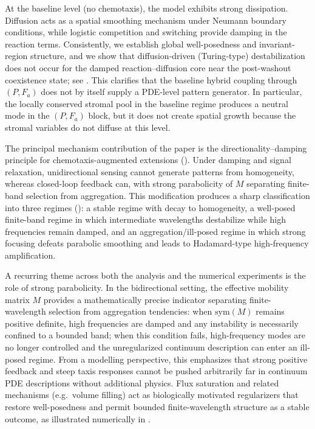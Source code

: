\documentclass[pdflatex,sn-mathphys-ay]{sn-jnl}
\theoremstyle{thmstyleone}
\theoremstyle{definition}
\theoremstyle{remark}
\begin{document}
At the baseline level (no chemotaxis), the model exhibits strong dissipation. 
Diffusion acts as a spatial smoothing mechanism under Neumann boundary conditions, while logistic competition and switching provide damping in the reaction terms. 
Consistently, we establish global well-posedness and invariant-region structure, and we show that diffusion-driven (Turing-type) destabilization does not occur for the damped reaction--diffusion core near the post-washout coexistence state; see . 
This clarifies that the baseline hybrid coupling through $(P,F_a)$ does not by itself supply a PDE-level pattern generator. 
In particular, the locally conserved stromal pool in the baseline regime produces a neutral mode in the $(P,F_a)$ block, but it does not create spatial growth because the stromal variables do not diffuse at this level.

The principal mechanism contribution of the paper is the directionality--damping principle for chemotaxis-augmented extensions ().
Under damping and signal relaxation, unidirectional sensing cannot generate patterns from homogeneity, whereas closed-loop feedback can, with strong parabolicity of $M$ separating finite-band selection from aggregation.
This modification produces a sharp classification into three regimes (): a stable regime with decay to homogeneity, a well-posed finite-band regime in which intermediate wavelengths destabilize while high frequencies remain damped, and an aggregation/ill-posed regime in which strong focusing defeats parabolic smoothing and leads to Hadamard-type high-frequency amplification.

A recurring theme across both the analysis and the numerical experiments is the role of strong parabolicity. 
In the bidirectional setting, the effective mobility matrix $M$ provides a mathematically precise indicator separating finite-wavelength selection from aggregation tendencies: when $\mathrm{sym}(M)$ remains positive definite, high frequencies are damped and any instability is necessarily confined to a bounded band; when this condition fails, high-frequency modes are no longer controlled and the unregularized continuum description can enter an ill-posed regime. 
From a modelling perspective, this emphasizes that strong positive feedback and steep taxis responses cannot be pushed arbitrarily far in continuum PDE descriptions without additional physics. 
Flux saturation and related mechanisms (e.g.\ volume filling) act as biologically motivated regularizers that restore well-posedness and permit bounded finite-wavelength structure as a stable outcome, as illustrated numerically in .
\end{document}
